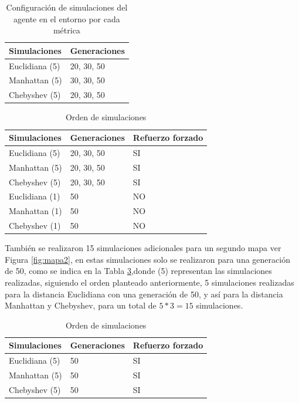 \documentclass[lettersize, journal]{IEEEtran}
\begin{document}
\begin{table}
\centering
\caption{Configuración de simulaciones del agente en el entorno por cada métrica}
\label{tab:fds}
\begin{tabular}{ll}
\toprule
\textbf{Simulaciones} & \textbf{Generaciones} \\
\midrule
Euclidiana (5)   &  20, 30, 50 \\
Manhattan (5)    & 30, 30, 50 \\
Chebyshev (5)    & 20, 30, 50 \\
\bottomrule
\end{tabular}
\end{table}


\begin{table}
\centering
\caption{Orden de simulaciones}
\label{tab:fds_1}
\begin{tabular}{lll}
\toprule
\textbf{Simulaciones} & 
\textbf{Generaciones}  &
\textbf{Refuerzo forzado}\\
\midrule
Euclidiana (5)   &  20, 30, 50 & SI\\
Manhattan (5)     &  20, 30, 50 & SI\\
Chebyshev (5)     &  20, 30, 50 & SI\\
\bottomrule
Euclidiana (1)    & 50 & NO\\
Manhattan (1)     & 50 & NO\\
Chebyshev  (1)    & 50 & NO\\
\bottomrule
\end{tabular}
\end{table}

También se realizaron 15 simulaciones adicionales para un segundo mapa ver Figura \ref{fig:mapa2}, en estas simulaciones solo se realizaron para una generación de 50, como se indica en la Tabla \ref{tab:fds_2},donde (5) representan las simulaciones realizadas, siguiendo el orden planteado anteriormente, 5 simulaciones realizadas para la distancia Euclidiana con una generación de 50, y así para la distancia Manhattan y Chebyshev, para un total de $5*3=15$ simulaciones.

\begin{table}
\centering
\caption{Orden de simulaciones}
\label{tab:fds_2}
\begin{tabular}{lll}
\toprule
\textbf{Simulaciones} & 
\textbf{Generaciones}  &
\textbf{Refuerzo forzado}\\
\midrule
Euclidiana (5)   &50 & SI\\
Manhattan (5)     &50 & SI\\
Chebyshev (5)     &50 & SI\\
\bottomrule
\end{tabular}
\end{table}
\end{document}
